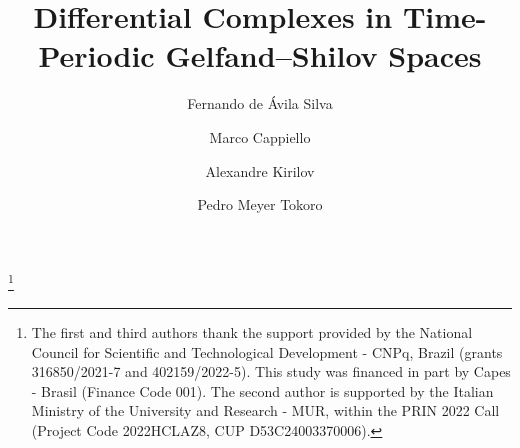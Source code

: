 \documentclass[12pt,reqno]{amsart}
\theoremstyle{definition}
\numberwithin{equation}{section}
\begin{document}
	

	
\title{Differential Complexes in Time-Periodic Gelfand--Shilov Spaces}
	

\author[F. de \'Avila Silva]{Fernando de \'Avila Silva}
\address{
	Departamento de Matem\'atica 
	Universidade Federal do Paran\'a  
	CP 19096, CEP 81531-990, Curitiba 
	Brasil}
	
\author[M. Cappiello]{Marco Cappiello}
\address{Dipartimento di Matematica ``Giuseppe Peano'',
	Università degli Studi di Torino,
	Via Carlo Alberto 10, 10123 Torino,
	Italia
	}
	
\author[A. Kirilov]{Alexandre Kirilov}
\address{
	Departamento de Matem\'atica 
	Universidade Federal do Paran\'a  
	CP 19096, CEP 81531-990, Curitiba 
	Brasil}
	
\author[P. M. Tokoro]{Pedro Meyer Tokoro}
\address{
	Programa de P\'os-Gradua\c c\~ao em Matem\'atica 
	Universidade Federal do Paran\'a  
	CP 19096, CEP 81531-990, Curitiba 
	Brasil}

\thanks{The first and third authors thank the support provided by the National Council for Scientific and Technological Development - CNPq, Brazil (grants 316850/2021-7 and 402159/2022-5). This study was financed in part by Capes - Brasil (Finance Code 001). The second author is supported by the Italian Ministry of the University and Research - MUR,	within the PRIN 2022 Call (Project Code 2022HCLAZ8, CUP D53C24003370006).}





	\maketitle 
\end{document}
